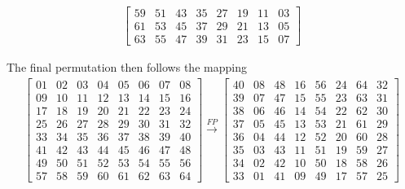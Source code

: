 \documentclass[11pt,a4paper]{article}
\begin{document}
\begin{enumerate}
\begin{itemize}
\begin{align*}
\begin{bmatrix}
				59 & 51 & 43 & 35 & 27 & 19 & 11 & 03 \\
				61 & 53 & 45 & 37 & 29 & 21 & 13 & 05 \\
				63 & 55 & 47 & 39 & 31 & 23 & 15 & 07
			\end{bmatrix}
		\end{align*}
		\par The final permutation then follows the mapping
		\begin{align*}
			\begin{bmatrix}
				01 & 02 & 03 & 04 & 05 & 06 & 07 & 08 \\
				09 & 10 & 11 & 12 & 13 & 14 & 15 & 16 \\
				17 & 18 & 19 & 20 & 21 & 22 & 23 & 24 \\
				25 & 26 & 27 & 28 & 29 & 30 & 31 & 32 \\
				33 & 34 & 35 & 36 & 37 & 38 & 39 & 40 \\
				41 & 42 & 43 & 44 & 45 & 46 & 47 & 48 \\
				49 & 50 & 51 & 52 & 53 & 54 & 55 & 56 \\
				57 & 58 & 59 & 60 & 61 & 62 & 63 & 64
			\end{bmatrix}
			\xrightarrow{FP}
			\begin{bmatrix}
				40 & 08 & 48 & 16 & 56 & 24 & 64 & 32 \\
				39 & 07 & 47 & 15 & 55 & 23 & 63 & 31 \\
				38 & 06 & 46 & 14 & 54 & 22 & 62 & 30 \\
				37 & 05 & 45 & 13 & 53 & 21 & 61 & 29 \\
				36 & 04 & 44 & 12 & 52 & 20 & 60 & 28 \\
				35 & 03 & 43 & 11 & 51 & 19 & 59 & 27 \\
				34 & 02 & 42 & 10 & 50 & 18 & 58 & 26 \\
				33 & 01 & 41 & 09 & 49 & 17 & 57 & 25
			\end{bmatrix}
		\end{align*}


\end{itemize}
\end{enumerate}
\end{document}
